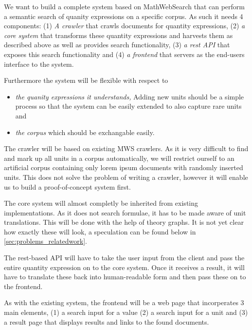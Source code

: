 \documentclass[11pt]{article}
\begin{document}
We want to build a complete system based on MathWebSearch that can perform a semantic search of quanity expressions on a specific corpus. As such it needs 4 components: (1) \textit{A crawler} that crawls documents for quantity expressions, (2) \textit{a core system} that transforms these quantity expressions and harvests them as described above as well as provides search functionality, (3) \textit{a rest API} that exposes this search functionality and (4) \textit{a frontend} that servers as the end-users interface to the system.


Furthermore the system will be flexible with respect to
\begin{itemize}
  \item \textit{the quanity expressions it understands, } Adding new units should be a simple process so that the system can be easily extended to also capture rare units and
  \item \textit{the corpus} which should be exchangable easily.
\end{itemize}

The crawler will be based on existing MWS crawlers. As it is very difficult to find and mark up all units in a corpus automatically, we will restrict ourself to an artificial corpus containing only lorem ipsum documents with randomly inserted units. This does not solve the problem of writing a crawler, however it will enable us to build a proof-of-concept system first.

The core system will almost completly be inherited from existing implementations. As it does not search formulae, it has to be made aware of unit translations. This will be done with the help of theory graphs. It is not yet clear how exactly these will look, a speculation can be found below in \ref{sec:problems_relatedwork}.

The rest-based API will have to take the user input from the client and pass the entire quantity expression on to the core system. Once it receives a result, it will have to translate these back into human-readable form and then pass these on to the frontend.

As with the existing system, the frontend will be a web page that incorperates 3 main elements, (1) a search input for a value (2) a search input for a unit and (3) a result page that displays results and links to the found documents.
\end{document}

